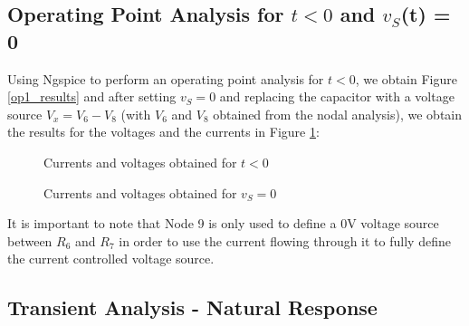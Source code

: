 \label{sec:sim}
\subsection{Operating Point Analysis for $t < 0$ and $v_S$(t) = 0}
\hspace{12pt} Using Ngspice to perform an operating point analysis for $t < 0$, we obtain Figure \ref{op1_results} and after setting $v_S = 0$ and replacing the capacitor with a voltage source $V_x = V_6 - V_8$ (with $V_6$ and $V_8$ obtained from the nodal analysis), we obtain the results for the voltages and the currents in Figure \ref{op2_results}:
\begin{figure}[h]
	\hspace{30pt}
	\begin{minipage}{.4\textwidth}
		\centering
			\caption{Currents and voltages obtained for $t < 0$}
			\label{op1_results}
	\end{minipage}
	\hspace{20pt}
	\begin{minipage}{.4\textwidth}
		\centering
			\caption{Currents and voltages obtained for $v_S = 0$}
			\label{op2_results}
	\end{minipage}
\end{figure}

It is important to note that Node 9 is only used to define a 0V voltage source between $R_6$ and $R_7$ in order to use the current flowing through it to fully define the current controlled voltage source.

\subsection{Transient Analysis - Natural Response}

